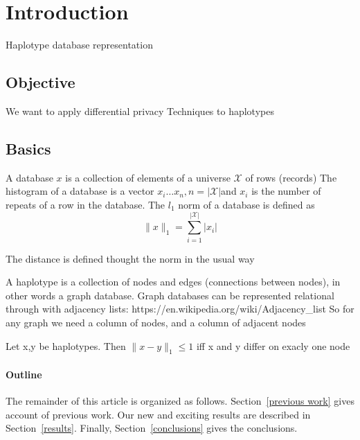 \documentclass[12pt]{article}
\begin{document}
\maketitle


\section*{Introduction}
Haplotype database representation

\subsection*{Objective}
We want to apply differential privacy Techniques to haplotypes

\subsection*{Basics}
A database $x$ is a collection  of elements of a universe $\mathcal{X}$ of rows (records)
The histogram of a database is a vector $x_i \ldots x_n, n = |\mathcal{X}| $and $x_i$ is the number
of repeats of a row in the database. The $l_1$ norm of a database is defined as
\begin{equation}
        \|x\|_1 = \sum_{i=1}^{|\mathcal{X}|} |x_i|
\end{equation}



The distance is defined thought the norm in the usual way

A haplotype is a  collection of nodes and edges (connections between nodes), in
other words a graph database.
Graph databases can be represented relational through with adjacency lists: https://en.wikipedia.org/wiki/Adjacency_list
So for any graph we need a column of nodes, and a column of adjacent nodes

\begin{corollary*}
Let x,y be haplotypes. Then $\|x-y\|_1 \leq 1$ iff x and y differ on exacly one node

\end{corollary*}
\paragraph{Outline}
The remainder of this article is organized as follows.
Section~\ref{previous work} gives account of previous work.
Our new and exciting results are described in Section~\ref{results}.
Finally, Section~\ref{conclusions} gives the conclusions.




\end{document}
